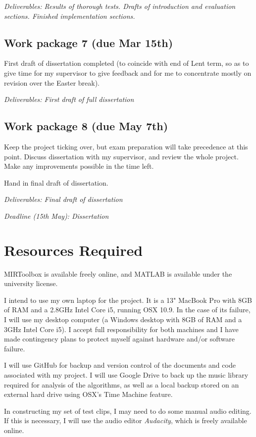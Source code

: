 \documentclass[12pt]{article}
\begin{document}
\emph{Deliverables: Results of thorough tests. Drafts of introduction and evaluation sections. Finished implementation sections.}

\subsection*{Work package 7 (due Mar 15th)}
First draft of dissertation completed (to coincide with end of Lent term, so as to give time for my supervisor to give feedback and for me to concentrate mostly on revision over the Easter break).

\emph{Deliverables: First draft of full dissertation}

\subsection*{Work package 8 (due May 7th)}
Keep the project ticking over, but exam preparation will take precedence at this point. Discuss dissertation with my supervisor, and review the whole project. Make any improvements possible in the time left.

Hand in final draft of dissertation. 

\emph{Deliverables: Final draft of dissertation}

\emph{Deadline (15th May): Dissertation}


\section*{Resources Required}

MIRToolbox is available freely online, and MATLAB is available under the university license.

I intend to use my own laptop for the project. It is a 13" MacBook Pro with 8GB of RAM and a 2.8GHz Intel Core i5, running OSX 10.9. In the case of its failure, I will use my desktop computer (a Windows desktop with 8GB of RAM and a 3GHz Intel Core i5). I accept full responsibility for both machines and I have made contingency plans to protect myself against hardware and/or software failure.

I will use GitHub for backup and version control of the documents and code associated with my project. I will use Google Drive to back up the music library required for analysis of the algorithms, as well as a local backup stored on an external hard drive using OSX's Time Machine feature.

In constructing my set of test clips, I may need to do some manual audio editing. If this is necessary, I will use the audio editor \emph{Audacity}, which is freely available online.
\end{document}
